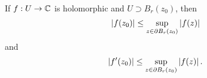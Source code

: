 \documentclass{homework}
\begin{document}
                                                                                                                                                                                                                       \begin{problem}\label{cauchy-inequalities}If $f : U \to \mathbb{C}$ is
                                                                                                                                                                                                                         holomorphic and $U \supset B_r(z_0)$, then
                                                                                                                                                                                                                           \[
                                                                                                                                                                                                                                \left|f(z_0)\right| \leq \sup_{z \in \partial B_r(z_0)} \left|f(z)\right|
                                                                                                                                                                                                                                   \]
                                                                                                                                                                                                                                      and
                                                                                                                                                                                                                                         \[
                                                                                                                                                                                                                                              \abs{f'(z_0)} \leq \sup_{z \in \partial B_r(z_0)} \abs{f(z)}. %
                                                                                                                                                                                                                                                 \]
                                                                                                                                                                                                                                                  \end{problem}
\end{document}
